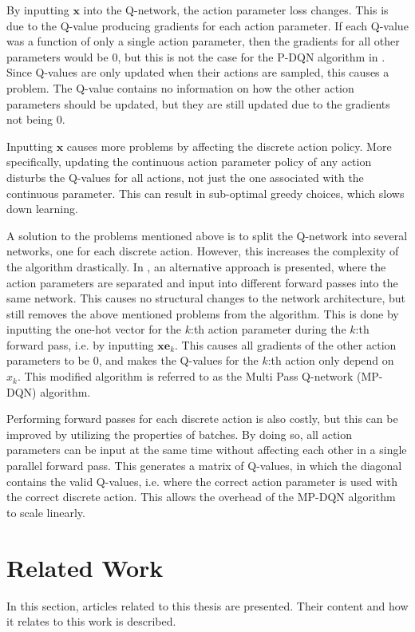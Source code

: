 \documentclass{kththesis}
\begin{document}
By inputting $\boldsymbol{x}$ into the Q-network, the action parameter loss changes. This is due to the Q-value producing gradients for each action parameter. If each Q-value was a function of only a single action parameter, then the gradients for all other parameters would be $0$, but this is not the case for the P-DQN algorithm in \textcite{xiong2018parametrized}. Since Q-values are only updated when their actions are sampled, this causes a problem. The Q-value contains no information on how the other action parameters should be updated, but they are still updated due to the gradients not being $0$. 

Inputting $\boldsymbol{x}$ causes more problems by affecting the discrete action policy. More specifically, updating the continuous action parameter policy of any action disturbs the Q-values for all actions, not just the one associated with the continuous parameter. This can result in sub-optimal greedy choices, which slows down learning. \parencite{bester2019mpdqn}

A solution to the problems mentioned above is to split the Q-network into several networks, one for each discrete action. However, this increases the complexity of the algorithm drastically. In \textcite{bester2019mpdqn}, an alternative approach is presented, where the action parameters are separated and input into different forward passes into the same network. This causes no structural changes to the network architecture, but still removes the above mentioned problems from the algorithm. This is done by inputting the one-hot vector for the $k$:th action parameter during the $k$:th forward pass, i.e. by inputting $\boldsymbol{x}\boldsymbol{e}_k$. This causes all gradients of the other action parameters to be $0$, and makes the Q-values for the $k$:th action only depend on $x_k$. This modified algorithm is referred to as the Multi Pass Q-network (MP-DQN) algorithm. \parencite{bester2019mpdqn}

Performing forward passes for each discrete action is also costly, but this can be improved by utilizing the properties of batches. By doing so, all action parameters can be input at the same time without affecting each other in a single parallel forward pass. This generates a matrix of Q-values, in which the diagonal contains the valid Q-values, i.e. where the correct action parameter is used with the correct discrete action. This allows the overhead of the MP-DQN algorithm to scale linearly. \parencite{bester2019mpdqn}

\section{Related Work}
In this section, articles related to this thesis are presented. Their content and how it relates to this work is described.
\end{document}
